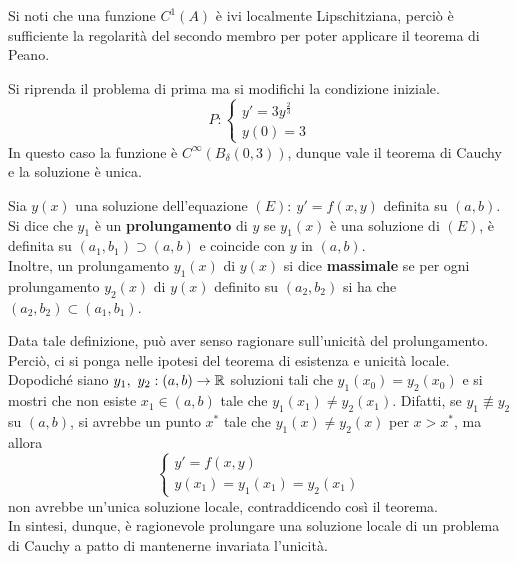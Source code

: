 \begin{oss}
    Si noti che una funzione $C^1(A)$ è ivi localmente Lipschitziana, perciò  è sufficiente la regolarità del secondo membro per poter applicare il teorema di Peano.
\end{oss}
\begin{example}
    Si riprenda il problema di prima ma si modifichi la condizione iniziale.
    \begin{equation*}
        P: \begin{cases}
        y'=3y^{\frac{2}{3}}\\
        y(0)=3
    \end{cases}
    \end{equation*}
    In questo caso la funzione è $C^\infty(B_\delta(0,3))$, dunque vale il teorema di Cauchy e la soluzione è unica.
\end{example}
\begin{definition} \label{Prolungamento}
    Sia $y(x)$ una soluzione dell'equazione $(E):\ y'=f(x,y)$ definita su $(a,b)$. Si dice che $y_1$ è un \textbf{prolungamento} di $y$ se $y_1(x)$ è una soluzione di $(E)$, è definita su $(a_1, b_1) \supset (a,b)$ e coincide con $y$ in $(a,b)$.\\
    Inoltre, un prolungamento $y_1(x)$ di $y(x)$ si dice \textbf{massimale} se per ogni prolungamento $y_2(x)$ di $y(x)$ definito su $(a_2, b_2)$ si ha che $(a_2, b_2) \subset (a_1, b_1)$.
\end{definition}
\begin{oss}
Data tale definizione, può aver senso ragionare sull'unicità del prolungamento. Perciò, ci si ponga nelle ipotesi del teorema di esistenza e unicità locale. Dopodiché siano $y_1,\ y_2 : (a,b) \to \mathbb{R}$ soluzioni tali che $y_1(x_0)=y_2(x_0)$ e si mostri che non esiste $x_1 \in (a,b)$ tale che $y_1(x_1) \neq y_2(x_1)$. Difatti, se $y_1 \not\equiv y_2$ su $(a,b)$, si avrebbe un punto $x^*$ tale che $y_1(x) \neq y_2(x)$ per $x>x^*$, ma allora
\begin{equation}
    \begin{cases}    
    y'=f(x,y)\\
    y(x_1)=y_1(x_1)=y_2(x_1)
    \end{cases}
\end{equation}
non avrebbe un'unica soluzione locale, contraddicendo così il teorema.\\
In sintesi, dunque, è ragionevole prolungare una soluzione locale di un problema di Cauchy a patto di mantenerne invariata l'unicità.
\end{oss}
